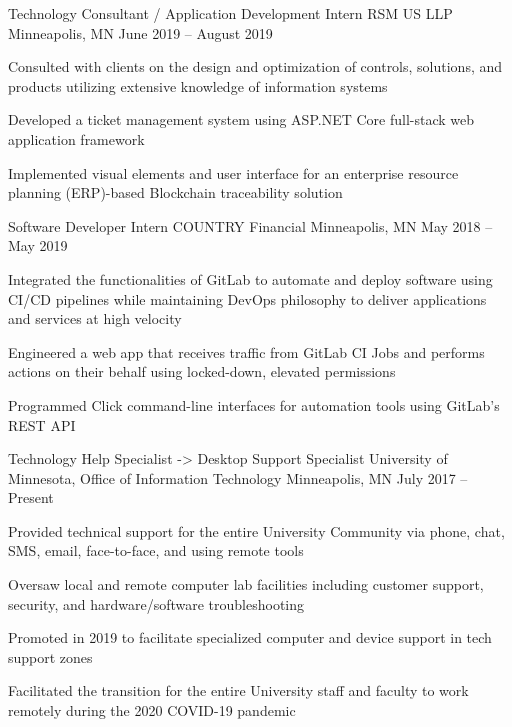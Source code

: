 \documentclass[]{awesome-cv}
\begin{document}
\vspace{-7mm}
\begin{cventries}
	\cventry
	{Technology Consultant / Application Development Intern}
	{RSM US LLP}
	{Minneapolis, MN}
	{June 2019 – August 2019}
	{\begin{cvitems}
		\item {Consulted with clients on the design and optimization of controls, solutions, and products utilizing extensive knowledge of information systems}
		\item {Developed a ticket management system using ASP.NET Core full-stack web application framework}
		\item {Implemented visual elements and user interface for an enterprise resource planning (ERP)-based Blockchain traceability solution}
		\end{cvitems}}
	\cventry
	{Software Developer Intern}
	{COUNTRY Financial}
	{Minneapolis, MN}
	{May 2018 – May 2019}
	{\begin{cvitems}
		\item {Integrated the functionalities of GitLab to automate and deploy software using CI/CD pipelines while maintaining DevOps philosophy to deliver applications and services at high velocity}
		\item {Engineered a web app that receives traffic from GitLab CI Jobs and performs actions on their behalf using locked-down, elevated permissions}
		\item {Programmed Click command-line interfaces for automation tools using GitLab’s REST API}
		\end{cvitems}}
	\cventry
	{Technology Help Specialist -> Desktop Support Specialist}
	{University of Minnesota, Office of Information Technology}
	{Minneapolis, MN}
	{July 2017 – Present}
	{\begin{cvitems}
		\item {Provided technical support for the entire University Community via phone, chat, SMS, email, face-to-­face, and using remote tools}
		\item {Oversaw local and remote computer lab facilities including customer support, security, and hardware/software troubleshooting}
		\item {Promoted in 2019 to facilitate specialized computer and device support in tech support zones}
		\item {Facilitated the transition for the entire University staff and faculty to work remotely during the 2020 COVID-19 pandemic}
		\end{cvitems}}
\end{cventries}
\end{document}
